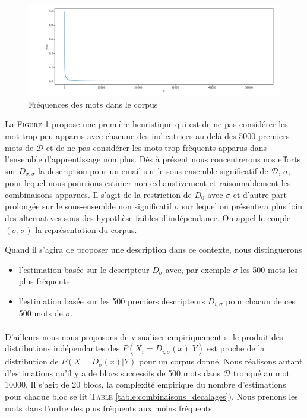 \documentclass[a4paper, french]{article}
\begin{document}
\begin{figure}[h]
\begin{center}
    \caption{Fr\'equences des mots dans le corpus}
    \includegraphics[width=13cm]{repr0}
\end{center}
\label{fig:repr0}
\end{figure}

La F\textsc{igure} \ref{fig:repr0} propose une premi\`ere heuristique qui est
de ne pas consid\'erer les mot trop peu apparus avec chacune des indicatrices
au del\`a des 5000 premiers mots de $\mathcal{D}$ et de ne pas consid\'erer 
les mots trop fr\`equents  apparus dans l'ensemble d'apprentissage non plus.
D\`es \`a pr\'esent nous concentrerons nos efforts sur $D_{\sigma,\overline\sigma}$
la description pour un email sur le sous-ensemble significatif de
$\mathcal{D}$, $\sigma$, pour lequel nous pourrions estimer non exhaustivement
et raisonnablement les combinaisons apparues. Il s'agit de la restriction de
$D_0$ avec $\sigma$ et d'autre part prolong\'ee sur le sous-ensemble 
non significatif $\overline\sigma$ sur lequel on pr\'esentera plus loin 
des alternatives sous des hypoth\`ese faibles d'ind\'ependance. 
On appel le couple $(\sigma, \overline\sigma)$ la repr\'esentation du corpus.

Quand il s'agira de proposer une description dans ce contexte, nous distinguerons
\begin{itemize}
    \item l'estimation bas\'ee sur le descripteur $D_\sigma$ avec, par exemple
        $\sigma$ les 500 mots les plus fr\'equents
    \item l'estimation bas\'ee sur les 500 premiers descripteurs $D_{i,\sigma}$
        pour chacun de ces 500 mots de $\sigma$.
\end{itemize}

\paragraph{}
D'ailleurs nous nous proposons de visualiser empiriquement si le produit des
distributions ind\'ependantes des $P(X_i=D_{i,\sigma}(x)|Y)$  est proche de la distribution
de $P(X=D_{\sigma}(x)|Y)$ pour un corpus donn\'e. Nous r\'ealisons autant d'estimations
qu'il y a de blocs successifs de 500 mots dans $\mathcal{D}$ tronqu\'e au mot 10000. 
%
Il s'agit de 20 blocs, la complexit\'e empirique du nombre d'estimations 
pour chaque bloc se lit T\textsc{able} \ref{table:combinaisons_decalages}). 
%
Nous prenons les mots dans l'ordre des plus fr\'equents aux moins fr\'equents.
\end{document}
